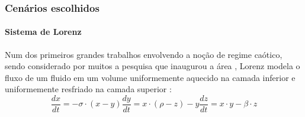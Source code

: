 \documentclass[aspectratio=169]{beamer}
\begin{document}
\begin{frame}
	\frametitle{Cenários escolhidos}
	\framesubtitle{Sistema de Lorenz}
\justifying Num dos primeiros grandes trabalhos envolvendo a noção de regime caótico, sendo considerado por muitos a pesquisa que inaugurou a área \cite{gleick1998chaos}, Lorenz modela o fluxo de um fluido em um volume uniformemente aquecido na camada inferior e uniformemente resfriado na camada superior \cite{lorenz1963deterministic}:
\begin{subequations}
\begin{equation}
\frac{dx}{dt} = -\sigma \cdot (x - y)
\end{equation}
\begin{equation}
\frac{dy}{dt} = x \cdot (\rho - z) - y
\end{equation}
\begin{equation}
\frac{dz}{dt} = x \cdot y - \beta \cdot z
\end{equation}
\end{subequations}
\end{frame}
\end{document}

